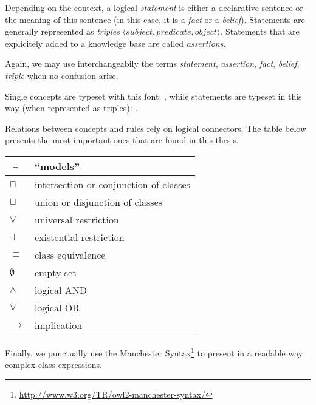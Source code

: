Depending on the context, a logical \emph{statement} is either a declarative sentence or
the meaning of this sentence (in this case, it is a \emph{fact} or a
\emph{belief}). Statements are generally represented as
\emph{triples} $\langle subject, predicate, object \rangle$. Statements that are
explicitely added to a knowledge base are called \emph{assertions}.

Again, we may use interchangeabily the terms \emph{statement},
\emph{assertion}, \emph{fact}, \emph{belief}, \emph{triple} when no confusion
arise.

Single concepts are typeset with this font: , while statements
are typeset in this way (when represented as triples): .

Relations between concepts and rules rely on logical connectors. The table
below presents the most important ones that are found in this thesis.

\begin{center}
\begin{tabular}{ll}
\toprule
$\models$ & ``models'' \\
\midrule
$\sqcap$ & intersection or conjunction of classes \\
$\sqcup$ & union or disjunction of classes \\
$\forall$ & universal restriction \\
$\exists$ & existential restriction \\
$\equiv$ & class equivalence \\
$\emptyset$ & empty set \\
\midrule
$\land$ & logical AND \\
$\lor$ & logical OR \\
$\to$ & implication \\
\bottomrule
\end{tabular}
\end{center}

Finally, we punctually use the Manchester
Syntax\footnote{\url{http://www.w3.org/TR/owl2-manchester-syntax/}} to present
in a readable way complex class expressions.

\clearpage
